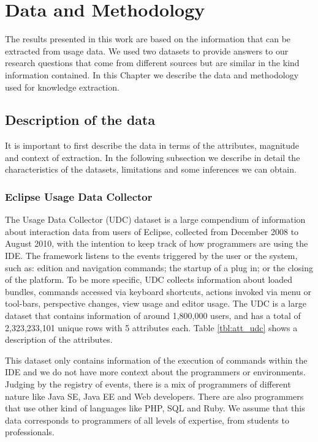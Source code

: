 \chapter{Data and Methodology}
The results presented in this work are based on the information that can be extracted from usage data. We used two datasets to provide answers to our research questions that come from different sources but are similar in the kind information contained. In this Chapter we describe the data and methodology used for knowledge extraction.

\section{Description of the data}
It is important to first describe the data in terms of the attributes, magnitude and context of extraction. In the following subsection we describe in detail the characteristics of the datasets, limitations and some inferences we can obtain.

\subsection{Eclipse Usage Data Collector}
The Usage Data Collector (UDC) dataset is a large compendium of information about interaction data from users of Eclipse, collected from December 2008 to August 2010, with the intention to keep track of how programmers are using the IDE. The framework listens to the events triggered by the user or the system, such as: edition and navigation commands; the startup of a plug in; or the closing of the platform. To be more specific, UDC collects information about loaded bundles, commands accessed via keyboard shortcuts, actions invoked via menu or tool-bars, perspective changes, view usage and editor usage. The UDC is a large dataset that contains information of around 1,800,000 users, and has a total of 2,323,233,101 unique rows with 5 attributes each. Table \ref{tbl:att_udc} shows a description of the attributes.

This dataset only contains information of the execution of commands within the IDE and we do not have more context about the programmers or environments. Judging by the registry of events, there is a mix of programmers of different nature like Java SE, Java EE and Web developers. There are also programmers that use other kind of languages like PHP, SQL and Ruby. We assume that this data corresponds to programmers of all levels of expertise, from students to professionals.


